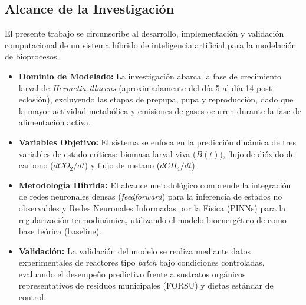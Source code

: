 \subsection{Alcance de la Investigación}
El presente trabajo se circunscribe al desarrollo, implementación y validación computacional de un sistema híbrido de inteligencia artificial para la modelación de bioprocesos.
\begin{itemize}
    \item \textbf{Dominio de Modelado:} La investigación abarca la fase de crecimiento larval de \textit{Hermetia illucens} (aproximadamente del día 5 al día 14 post-eclosión), excluyendo las etapas de prepupa, pupa y reproducción, dado que la mayor actividad metabólica y emisiones de gases ocurren durante la fase de alimentación activa.
    \item \textbf{Variables Objetivo:} El sistema se enfoca en la predicción dinámica de tres variables de estado críticas: biomasa larval viva ($B(t)$), flujo de dióxido de carbono ($dCO_2/dt$) y flujo de metano ($dCH_4/dt$).
    \item \textbf{Metodología Híbrida:} El alcance metodológico comprende la integración de redes neuronales densas (\textit{feedforward}) para la inferencia de estados no observables y Redes Neuronales Informadas por la Física (PINNs) para la regularización termodinámica, utilizando el modelo bioenergético de \textcite{eriksenDynamicModellingFeed2022} como base teórica (baseline).
    \item \textbf{Validación:} La validación del modelo se realiza mediante datos experimentales de reactores tipo \textit{batch} bajo condiciones controladas, evaluando el desempeño predictivo frente a sustratos orgánicos representativos de residuos municipales (FORSU) y dietas estándar de control.
\end{itemize}

